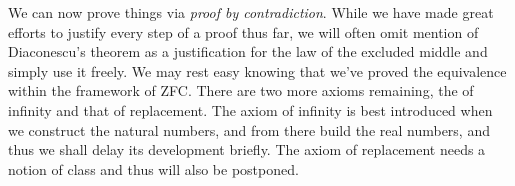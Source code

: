         We can now prove things via \textit{proof by contradiction}. While we
        have made great efforts to justify every step of a proof thus far, we
        will often omit mention of Diaconescu's theorem as a justification for
        the law of the excluded middle and simply use it freely. We may rest
        easy knowing that we've proved the equivalence within the framework of
        ZFC. There are two more axioms remaining, the of infinity and that of
        replacement. The axiom of infinity is best introduced when we construct
        the natural numbers, and from there build the real numbers, and thus we
        shall delay its development briefly. The axiom of replacement needs a
        notion of class and thus will also be postponed.